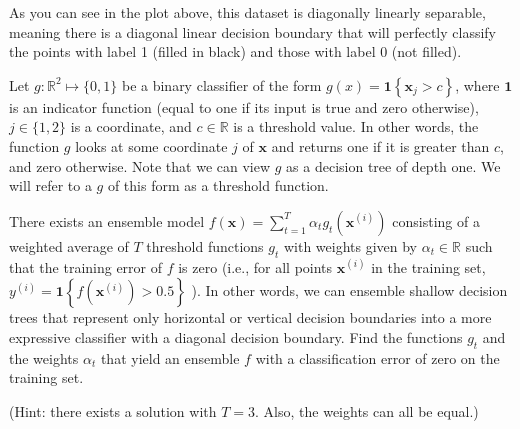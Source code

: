 \documentclass[10pt, a4paper]{article}
\begin{document}
As you can see in the plot above, this dataset is diagonally linearly separable, meaning there is a diagonal linear decision boundary that will perfectly classify the points with label 1 (filled in black) and those with label 0 (not filled).

\begin{Problem*}[(a)]
 Let $g: \mathbb{R}^{2} \mapsto\{0,1\}$ be a binary classifier of the form $g(x)=\mathbf{1}\left\{\mathbf{x}_{j}>c\right\}$, where $\mathbf{1}$ is an indicator function (equal to one if its input is true and zero otherwise), $j \in\{1,2\}$ is a coordinate, and $c \in \mathbb{R}$ is a threshold value. In other words, the function $g$ looks at some coordinate $j$ of $\mathbf{x}$ and
returns one if it is greater than $c$, and zero otherwise. Note that we can view $g$ as a decision tree of depth one. We will refer to a $g$ of this form as a threshold function.

There exists an ensemble model $f(\mathbf{x})=\sum_{t=1}^{T} \alpha_{t} g_{t}\left(\mathbf{x}^{(i)}\right)$ consisting of a weighted average of $T$ threshold functions $g_{t}$ with weights given by $\alpha_{t} \in \mathbb{R}$ such that the training error of $f$ is zero (i.e., for all points $\mathbf{x}^{(i)}$ in the training set, $y^{(i)}=\mathbf{1}\left\{f\left(\mathbf{x}^{(i)}\right)>0.5\right\}$ ). In other words, we can ensemble shallow decision trees that represent only horizontal or vertical decision boundaries into a more expressive classifier with a diagonal decision boundary. Find the functions $g_{t}$ and the weights $\alpha_{t}$ that yield an ensemble $f$ with a classification error of zero on the training set.

(Hint: there exists a solution with $T=3$. Also, the weights can all be equal.)
\end{Problem*} 
\end{document}
